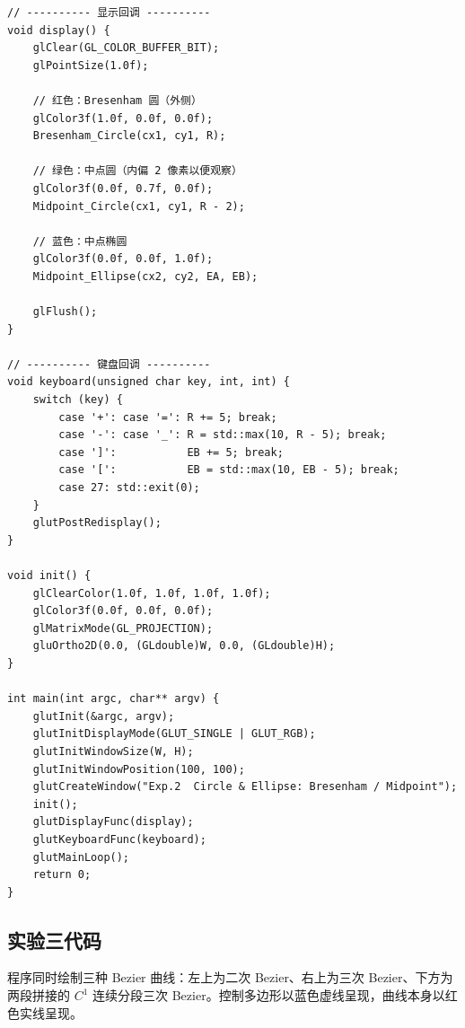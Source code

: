 \documentclass[a4paper,12pt]{ctexart}
\begin{document}
\begin{lstlisting}[style=cppstyle,caption={圆弧/椭圆生成 —— 完整源代码}]
// ---------- 显示回调 ----------
void display() {
    glClear(GL_COLOR_BUFFER_BIT);
    glPointSize(1.0f);

    // 红色：Bresenham 圆（外侧）
    glColor3f(1.0f, 0.0f, 0.0f);
    Bresenham_Circle(cx1, cy1, R);

    // 绿色：中点圆（内偏 2 像素以便观察）
    glColor3f(0.0f, 0.7f, 0.0f);
    Midpoint_Circle(cx1, cy1, R - 2);

    // 蓝色：中点椭圆
    glColor3f(0.0f, 0.0f, 1.0f);
    Midpoint_Ellipse(cx2, cy2, EA, EB);

    glFlush();
}

// ---------- 键盘回调 ----------
void keyboard(unsigned char key, int, int) {
    switch (key) {
        case '+': case '=': R += 5; break;
        case '-': case '_': R = std::max(10, R - 5); break;
        case ']':           EB += 5; break;
        case '[':           EB = std::max(10, EB - 5); break;
        case 27: std::exit(0);
    }
    glutPostRedisplay();
}

void init() {
    glClearColor(1.0f, 1.0f, 1.0f, 1.0f);
    glColor3f(0.0f, 0.0f, 0.0f);
    glMatrixMode(GL_PROJECTION);
    gluOrtho2D(0.0, (GLdouble)W, 0.0, (GLdouble)H);
}

int main(int argc, char** argv) {
    glutInit(&argc, argv);
    glutInitDisplayMode(GLUT_SINGLE | GLUT_RGB);
    glutInitWindowSize(W, H);
    glutInitWindowPosition(100, 100);
    glutCreateWindow("Exp.2  Circle & Ellipse: Bresenham / Midpoint");
    init();
    glutDisplayFunc(display);
    glutKeyboardFunc(keyboard);
    glutMainLoop();
    return 0;
}
\end{lstlisting}

\subsection{实验三代码}

程序同时绘制三种 Bezier 曲线：左上为二次 Bezier、右上为三次 Bezier、下方为
两段拼接的 $C^1$ 连续分段三次 Bezier。控制多边形以蓝色虚线呈现，曲线本身以红色实线呈现。
\end{document}
